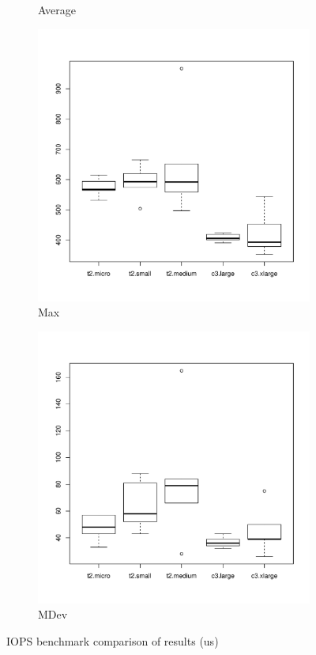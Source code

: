 \documentclass[10pt, conference]{IEEEtran}
\begin{document}
\begin{figure}
\begin{subfigure}[b]{0.24\textwidth}
                \caption{Average}
                \label{fig:avr}
        \end{subfigure}
        \begin{subfigure}[b]{0.24\textwidth}
                \includegraphics[width=\textwidth]{plots/iopingMax.pdf}
                \caption{Max}
                \label{fig:max}
        \end{subfigure}
         \begin{subfigure}[b]{0.24\textwidth}
                \includegraphics[width=\textwidth]{plots/iopingMdev.pdf}
                \caption{MDev}
                \label{fig:mdev}
        \end{subfigure}
        \caption{\label{fig:IOPSResults} IOPS benchmark comparison of results (us)}
\end{figure}
\end{document}
